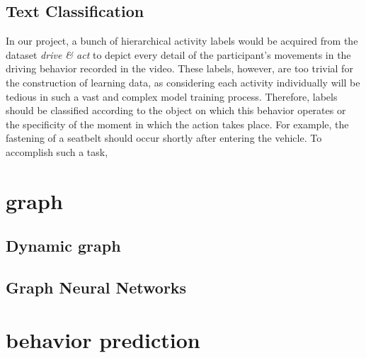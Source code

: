     \subsection{Text Classification}
In our project, a bunch of hierarchical activity labels would be acquired from the dataset \textit{drive \& act} to depict every detail of the participant's movements in the driving behavior recorded in the video. These labels, however, are too trivial for the construction of learning data, as considering each activity individually will be tedious in such a vast and complex model training process. Therefore, labels should be classified according to the object on which this behavior operates or the specificity of the moment in which the action takes place. For example, the fastening of a seatbelt should occur shortly after entering the vehicle. To accomplish such a task, 


\section{graph}




    \subsection{Dynamic graph}

    \subsection{Graph Neural Networks}

\section{behavior prediction}

